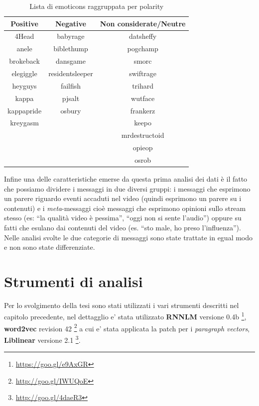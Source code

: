 \documentclass[a4paper,12pt,openright,twoside]{report}
\theoremstyle{definition}
\begin{document}
\begin{table}[H]
\begin{center}
\begin{tabular}{|c|c|c|}
\hline
Positive & Negative & Non considerate/Neutre \\
\hline
4Head & babyrage & datsheffy \\
\hline
anele &  biblethump &  pogchamp \\
\hline
brokeback &  dansgame & smorc \\
\hline
elegiggle & residentsleeper &  swiftrage \\
\hline
heyguys & failfish & trihard \\
\hline
kappa & pjsalt & wutface \\
\hline
kappapride & osbury & frankerz \\
\hline
kreygasm &  & keepo \\
\hline
 & & mrdestructoid \\
\hline
& & opieop \\
\hline
& & osrob \\
\hline
\end{tabular}
\end{center}
\caption{Lista di emoticons raggruppata per polarity}
\label{tab:emoticons2}
\end{table}

Infine una delle caratteristiche emerse da questa prima analisi dei dati è il fatto che possiamo dividere i messaggi in due diversi gruppi: i messaggi che esprimono un parere
riguardo eventi accaduti nel video (quindi esprimono un parere su i contenuti) e i \emph{meta}-messaggi cioè messaggi che esprimono opinioni sullo stream stesso (es: ``la qualità video
è pessima'', ``oggi non si sente l'audio'') oppure su fatti che esulano dai contenuti del video (es. ``sto male, ho preso l'influenza''). Nelle analisi svolte le due categorie
di messaggi sono state trattate in egual modo e non sono state differenziate.
  
\section{Strumenti di analisi}
Per lo svolgimento della tesi sono stati utilizzati i vari strumenti descritti nel capitolo precedente,
nel dettagglio e' stata utilizzato \textbf{RNNLM} versione 0.4b \footnote{\url{https://goo.gl/e9AxGR}}, 
\textbf{word2vec} revision 42 \footnote{\url{http://goo.gl/IWUQoE}}
a cui e' stata applicata la patch per i \emph{paragraph vectors}, \textbf{Liblinear} versione 2.1 \footnote{\url{http://goo.gl/4daeR3}}.
\end{document}
